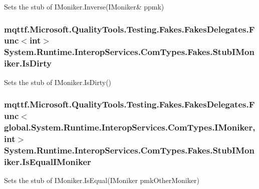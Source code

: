 Sets the stub of I\-Moniker.\-Inverse(I\-Moniker\& ppmk)

\hypertarget{class_system_1_1_runtime_1_1_interop_services_1_1_com_types_1_1_fakes_1_1_stub_i_moniker_a6f2e7dc4b7e331a74b628d0aa9d2b588}{
\subsubsection[{Is\-Dirty}]{\setlength{\rightskip}{0pt plus 5cm}mqttf.\-Microsoft.\-Quality\-Tools.\-Testing.\-Fakes.\-Fakes\-Delegates.\-Func$<$int$>$ System.\-Runtime.\-Interop\-Services.\-Com\-Types.\-Fakes.\-Stub\-I\-Moniker.\-Is\-Dirty}}\label{class_system_1_1_runtime_1_1_interop_services_1_1_com_types_1_1_fakes_1_1_stub_i_moniker_a6f2e7dc4b7e331a74b628d0aa9d2b588}


Sets the stub of I\-Moniker.\-Is\-Dirty()

\hypertarget{class_system_1_1_runtime_1_1_interop_services_1_1_com_types_1_1_fakes_1_1_stub_i_moniker_af7402221bbe9767abeeab8ab78fb8f2a}{
\subsubsection[{Is\-Equal\-I\-Moniker}]{\setlength{\rightskip}{0pt plus 5cm}mqttf.\-Microsoft.\-Quality\-Tools.\-Testing.\-Fakes.\-Fakes\-Delegates.\-Func$<$global.\-System.\-Runtime.\-Interop\-Services.\-Com\-Types.\-I\-Moniker, int$>$ System.\-Runtime.\-Interop\-Services.\-Com\-Types.\-Fakes.\-Stub\-I\-Moniker.\-Is\-Equal\-I\-Moniker}}\label{class_system_1_1_runtime_1_1_interop_services_1_1_com_types_1_1_fakes_1_1_stub_i_moniker_af7402221bbe9767abeeab8ab78fb8f2a}


Sets the stub of I\-Moniker.\-Is\-Equal(\-I\-Moniker pmk\-Other\-Moniker)

